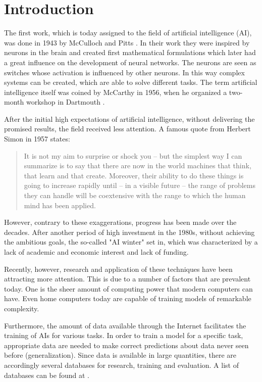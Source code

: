 \section{Introduction}

The first work, which is today assigned to the field of artificial intelligence (AI), was done in 1943 by McCulloch and Pitts \cite{McCulloch1943}.
In their work they were inspired by neurons in the brain and created first mathematical formulations which later had a great influence on the development of neural networks.
The neurons are seen as switches whose activation is influenced by other neurons.
In this way complex systems can be created, which are able to solve different tasks.
The term artificial intelligence itself was coined by McCarthy in 1956, when he organized a two-month workshop in Dartmouth \cite{McCarthy1955}.

After the initial high expectations of artificial intelligence, without delivering the promised results, the field received less attention.
A famous quote from Herbert Simon in 1957 states: 
\begin{quotation}
    It is not my aim to surprise or shock you – but the simplest way I can summarize is to say that there are now in the world machines that think, that learn and that create. Moreover, their ability to do these things is going to increase rapidly until – in a visible future – the range of problems they can handle will be coextensive with the range to which the human mind has been applied.
\end{quotation}

However, contrary to these exaggerations, progress has been made over the decades.
After another period of high investment in the 1980s, without achieving the ambitious goals, the so-called "AI winter" set in, which was characterized by a lack of academic and economic interest and lack of funding.

Recently, however, research and application of these techniques have been attracting more attention.
This is due to a number of factors that are prevalent today.
One is the sheer amount of computing power that modern computers can have.
Even home computers today are capable of training models of remarkable complexity.

Furthermore, the amount of data available through the Internet facilitates the training of AIs for various tasks.
In order to train a model for a specific task, appropriate data are needed to make correct predictions about data never seen before (generalization).
Since data is available in large quantities, there are accordingly several databases for research, training and evaluation.
A list of databases can be found at .

